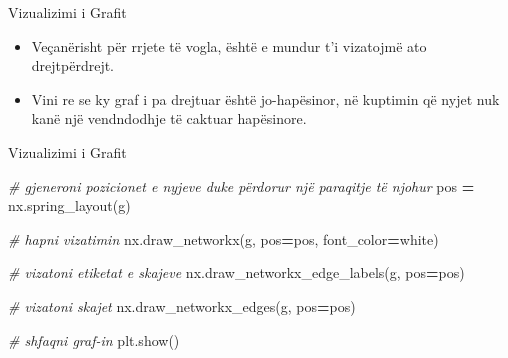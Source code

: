 \documentclass[
  ignorenonframetext,
]{beamer}
\newenvironment{Shaded}{\begin{snugshade}}{\end{snugshade}}
\newcommand{\CommentTok}[1]{\textcolor[rgb]{0.56,0.35,0.01}{\textit{#1}}}
\newcommand{\NormalTok}[1]{#1}
\newcommand{\OperatorTok}[1]{\textcolor[rgb]{0.81,0.36,0.00}{\textbf{#1}}}
\newcommand{\StringTok}[1]{\textcolor[rgb]{0.31,0.60,0.02}{#1}}
\begin{document}
\begin{frame}{Vizualizimi i Grafit}
\protect\hypertarget{vizualizimi-i-grafit}{}
\begin{itemize}
\item
  Veçanërisht për rrjete të vogla, është e mundur t'i vizatojmë ato
  drejtpërdrejt.
\item
  Vini re se ky graf i pa drejtuar është jo-hapësinor, në kuptimin që
  nyjet nuk kanë një vendndodhje të caktuar hapësinore.
\end{itemize}
\end{frame}

\begin{frame}[fragile]{Vizualizimi i Grafit}
\protect\hypertarget{vizualizimi-i-grafit-1}{}

\begin{Shaded}
\begin{Highlighting}[]
\CommentTok{\# gjeneroni pozicionet e nyjeve duke përdorur një paraqitje të njohur}
\NormalTok{pos }\OperatorTok{=}\NormalTok{ nx.spring\_layout(g)}

\CommentTok{\# hapni vizatimin}
\NormalTok{nx.draw\_networkx(g, pos}\OperatorTok{=}\NormalTok{pos, font\_color}\OperatorTok{=}\StringTok{\textquotesingle{}white\textquotesingle{}}\NormalTok{)}

\CommentTok{\# vizatoni etiketat e skajeve}
\NormalTok{nx.draw\_networkx\_edge\_labels(g, pos}\OperatorTok{=}\NormalTok{pos)}

\CommentTok{\# vizatoni skajet}
\NormalTok{nx.draw\_networkx\_edges(g, pos}\OperatorTok{=}\NormalTok{pos)}

\CommentTok{\# shfaqni graf{-}in}
\NormalTok{plt.show()}
\end{Highlighting}
\end{Shaded}
\end{frame}
\end{document}

